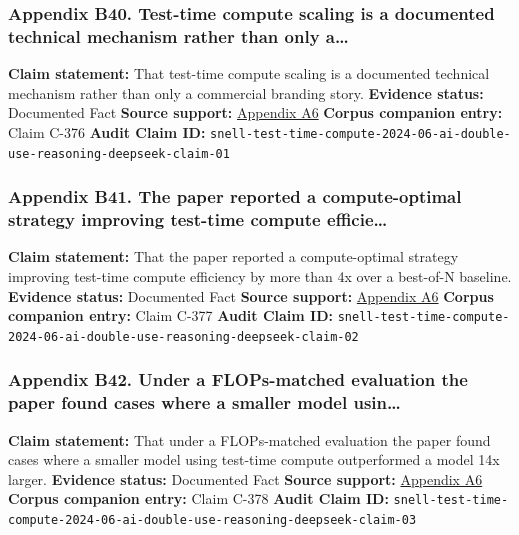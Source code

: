 \documentclass[
  american,
  11pt,
  letterpaper,
]{article}
\begin{document}
\subsubsection{Appendix B40. Test-time compute scaling is a documented
technical mechanism rather than only
a\ldots{}}\label{ch-06-appendix-b40-test-time-compute-scaling-is-a-documented-technical-mechanism-rather-than-only-a}

\textbf{Claim statement:} That test-time compute scaling is a documented
technical mechanism rather than only a commercial branding story.
\textbf{Evidence status:} Documented Fact \textbf{Source support:}
\hyperref[ch-06-appendix-a6-scaling-llm-test-time-compute-optimally-can-be-more-effective-than-scaling-model-parameters]{Appendix
A6} \textbf{Corpus companion entry:} Claim C-376 \textbf{Audit Claim
ID:}
\texttt{snell-test-time-compute-2024-06-ai-double-use-reasoning-deepseek-claim-01}

\subsubsection{Appendix B41. The paper reported a compute-optimal
strategy improving test-time compute
efficie\ldots{}}\label{ch-06-appendix-b41-the-paper-reported-a-compute-optimal-strategy-improving-test-time-compute-efficie}

\textbf{Claim statement:} That the paper reported a compute-optimal
strategy improving test-time compute efficiency by more than 4x over a
best-of-N baseline. \textbf{Evidence status:} Documented Fact
\textbf{Source support:}
\hyperref[ch-06-appendix-a6-scaling-llm-test-time-compute-optimally-can-be-more-effective-than-scaling-model-parameters]{Appendix
A6} \textbf{Corpus companion entry:} Claim C-377 \textbf{Audit Claim
ID:}
\texttt{snell-test-time-compute-2024-06-ai-double-use-reasoning-deepseek-claim-02}

\subsubsection{Appendix B42. Under a FLOPs-matched evaluation the paper
found cases where a smaller model
usin\ldots{}}\label{ch-06-appendix-b42-under-a-flops-matched-evaluation-the-paper-found-cases-where-a-smaller-model-usin}

\textbf{Claim statement:} That under a FLOPs-matched evaluation the
paper found cases where a smaller model using test-time compute
outperformed a model 14x larger. \textbf{Evidence status:} Documented
Fact \textbf{Source support:}
\hyperref[ch-06-appendix-a6-scaling-llm-test-time-compute-optimally-can-be-more-effective-than-scaling-model-parameters]{Appendix
A6} \textbf{Corpus companion entry:} Claim C-378 \textbf{Audit Claim
ID:}
\texttt{snell-test-time-compute-2024-06-ai-double-use-reasoning-deepseek-claim-03}
\end{document}
